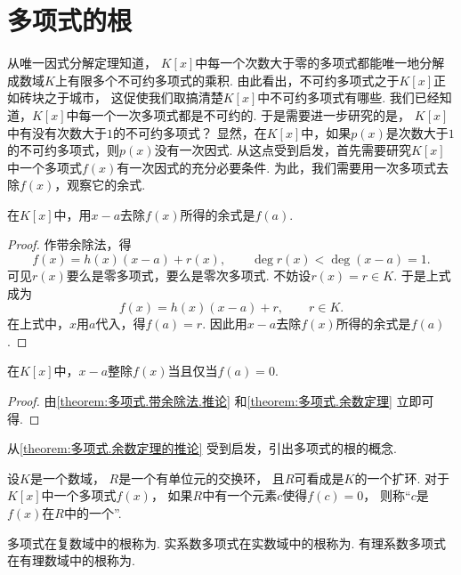 \section{多项式的根}
从唯一因式分解定理知道，
\(K[x]\)中每一个次数大于零的多项式都能唯一地分解成数域\(K\)上有限多个不可约多项式的乘积.
由此看出，不可约多项式之于\(K[x]\)正如砖块之于城市，
这促使我们取搞清楚\(K[x]\)中不可约多项式有哪些.
我们已经知道，\(K[x]\)中每一个一次多项式都是不可约的.
于是需要进一步研究的是，
\(K[x]\)中有没有次数大于\(1\)的不可约多项式？
显然，在\(K[x]\)中，如果\(p(x)\)是次数大于\(1\)的不可约多项式，则\(p(x)\)没有一次因式.
从这点受到启发，首先需要研究\(K[x]\)中一个多项式\(f(x)\)有一次因式的充分必要条件.
为此，我们需要用一次多项式去除\(f(x)\)，观察它的余式.

\begin{theorem}[余数定理]\label{theorem:多项式.余数定理}
在\(K[x]\)中，用\(x-a\)去除\(f(x)\)所得的余式是\(f(a)\).
\begin{proof}
作带余除法，得\[
	f(x) = h(x) (x-a) + r(x), \qquad
	\deg r(x) < \deg(x-a)=1.
\]
可见\(r(x)\)要么是零多项式，要么是零次多项式.
不妨设\(r(x)=r \in K\).
于是上式成为\[
	f(x) = h(x) (x-a) + r, \qquad
	r \in K.
\]
在上式中，\(x\)用\(a\)代入，得\(f(a) = r\).
因此用\(x-a\)去除\(f(x)\)所得的余式是\(f(a)\).
\end{proof}
\end{theorem}

\begin{corollary}\label{theorem:多项式.余数定理的推论}
在\(K[x]\)中，\(x-a\)整除\(f(x)\)当且仅当\(f(a)=0\).
\begin{proof}
由\cref{theorem:多项式.带余除法.推论}
和\cref{theorem:多项式.余数定理}
立即可得.
\end{proof}
\end{corollary}

从\cref{theorem:多项式.余数定理的推论} 受到启发，引出多项式的根的概念.

\begin{definition}\label{theorem:多项式.根的定义}
设\(K\)是一个数域，
\(R\)是一个有单位元的交换环，
且\(R\)可看成是\(K\)的一个扩环.
对于\(K[x]\)中一个多项式\(f(x)\)，
如果\(R\)中有一个元素\(c\)使得\(f(c)=0\)，
则称“\(c\)是\(f(x)\)在\(R\)中的一个”.
\end{definition}

多项式在复数域中的根称为.
实系数多项式在实数域中的根称为.
有理系数多项式在有理数域中的根称为.

